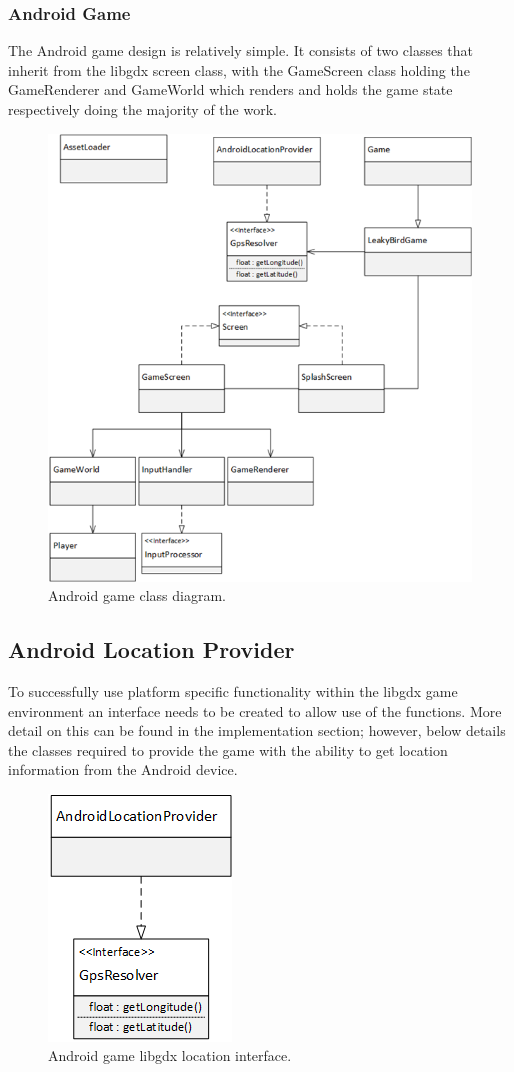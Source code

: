 \subsubsection{Android Game}
The Android game design is relatively simple. It consists of two classes that inherit from the libgdx screen class, with the GameScreen class holding the GameRenderer and GameWorld which renders and holds the game state respectively doing the majority of the work.
\clearpage
\begin{figure}[h!]
\centering\includegraphics[width=\linewidth]{design/figures/ag-cd.png}
\caption{Android game class diagram.}
\end{figure}
\clearpage
\subsection{Android Location Provider}
To successfully use platform specific functionality within the libgdx game environment an interface needs to be created to allow use of the functions. More detail on this can be found in the implementation section; however, below details the classes required to provide the game with the ability to get location information from the Android device.

\begin{figure}[h!]
\centering\includegraphics{design/figures/ag-lp-cd.png}
\caption{Android game libgdx location interface.}
\end{figure}

\clearpage